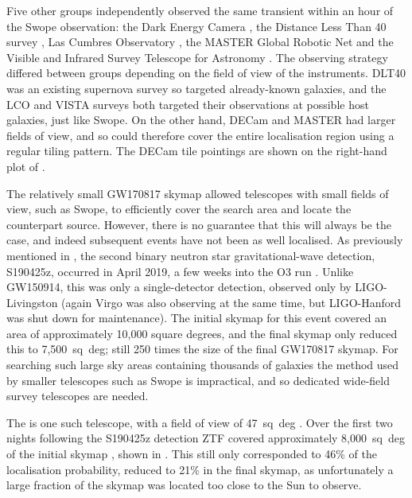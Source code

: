 \begin{colsection}
Five other groups independently observed the same transient within an hour of the Swope observation: the Dark Energy Camera \citep[DECam,][]{GW170817_DECam}, the Distance Less Than \SI{40}{\mega\parsec} survey \citep[DLT40,][]{GW170817_DLT40}, Las Cumbres Observatory \citep[LCO,][]{GW170817_LCO}, the MASTER Global Robotic Net \citep{GW170817_MASTER} and the  Visible and Infrared Survey Telescope for Astronomy \citep[VISTA,][]{GW170817_VISTA}. The observing strategy differed between groups depending on the field of view of the instruments. DLT40 was an existing supernova survey so targeted already-known galaxies, and the LCO and VISTA surveys both targeted their observations at possible host galaxies, just like Swope. On the other hand, DECam and MASTER had larger fields of view, and so could therefore cover the entire localisation region using a regular tiling pattern. The DECam tile pointings are shown on the right-hand plot of .

The relatively small GW170817 skymap allowed telescopes with small fields of view, such as Swope, to efficiently cover the search area and locate the counterpart source. However, there is no guarantee that this will always be the case, and indeed subsequent events have not been as well localised. As previously mentioned in , the second binary neutron star gravitational-wave detection, S190425z, occurred in April 2019, a few weeks into the O3 run \citep{S190425z}. Unlike GW150914, this was only a single-detector detection, observed only by LIGO-Livingston (again Virgo was also observing at the same time, but LIGO-Hanford was shut down for maintenance). The initial skymap for this event covered an area of approximately 10,000 square degrees, and the final skymap only reduced this to 7,500~sq~deg; still 250 times the size of the final GW170817 skymap. For searching such large sky areas containing thousands of galaxies the method used by smaller telescopes such as Swope is impractical, and so dedicated wide-field survey telescopes are needed.

The  is one such telescope, with a field of view of 47~sq~deg \citep{ZTF}. Over the first two nights following the S190425z detection ZTF covered approximately 8,000~sq~deg of the initial skymap \citep{S190425z_ZTF}, shown in . This still only corresponded to 46\% of the localisation probability, reduced to 21\% in the final skymap, as unfortunately a large fraction of the skymap was located too close to the Sun to observe.


\end{colsection}
